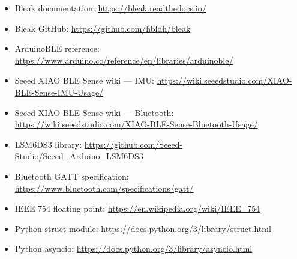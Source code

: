 \documentclass[11pt,a4paper]{article}
\begin{document}
\begin{itemize}
    \item Bleak documentation: \url{https://bleak.readthedocs.io/}
    \item Bleak GitHub: \url{https://github.com/hbldh/bleak}
    \item ArduinoBLE reference:
          \url{https://www.arduino.cc/reference/en/libraries/arduinoble/}
    \item Seeed XIAO BLE Sense wiki --- IMU:
          \url{https://wiki.seeedstudio.com/XIAO-BLE-Sense-IMU-Usage/}
    \item Seeed XIAO BLE Sense wiki --- Bluetooth:
          \url{https://wiki.seeedstudio.com/XIAO-BLE-Sense-Bluetooth-Usage/}
    \item LSM6DS3 library:
          \url{https://github.com/Seeed-Studio/Seeed_Arduino_LSM6DS3}
    \item Bluetooth GATT specification:
          \url{https://www.bluetooth.com/specifications/gatt/}
    \item IEEE 754 floating point:
          \url{https://en.wikipedia.org/wiki/IEEE_754}
    \item Python struct module:
          \url{https://docs.python.org/3/library/struct.html}
    \item Python asyncio:
          \url{https://docs.python.org/3/library/asyncio.html}
\end{itemize}
\end{document}
